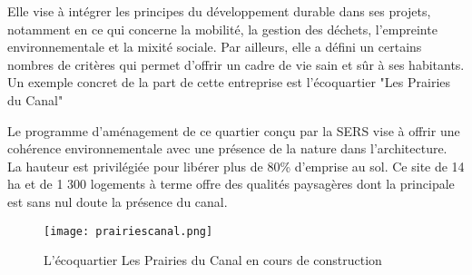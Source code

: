 Elle vise à intégrer les principes du développement durable dans ses projets, notamment en ce qui concerne la mobilité, la gestion des déchets, l'empreinte environnementale et la mixité sociale. Par ailleurs, elle a défini un certains nombres de critères qui permet d’offrir un cadre de vie sain et sûr à ses habitants.\\

Un exemple concret de la part de cette entreprise est l'écoquartier "Les Prairies du Canal"

Le programme d’aménagement de ce quartier conçu par la SERS vise à offrir une cohérence environnementale avec une présence de la nature dans l’architecture. La hauteur est privilégiée pour libérer plus de 80\% d’emprise au sol. Ce site de 14 ha et de 1 300 logements à terme offre des qualités paysagères dont la principale est sans nul doute la présence du canal.

\begin{figure}[!h]
\begin{center}
\texttt{[image: prairiescanal.png]}
\end{center}
\caption{L'écoquartier Les Prairies du Canal en cours de construction}
\end{figure}





